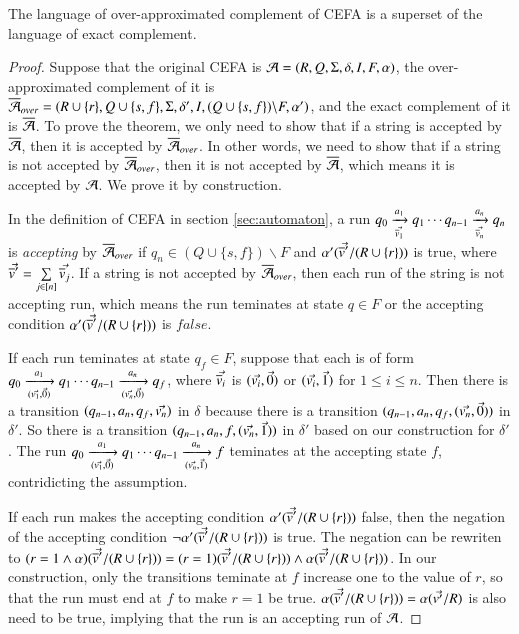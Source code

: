 \begin{theorem}
  The language of over-approximated complement of CEFA is a superset of the language of exact complement.
\end{theorem}
\begin{proof}
   Suppose that the original CEFA is $\mathcal{A} = (R, Q, \Sigma, \delta, I, F, \alpha)$, the over-approximated complement of it is $\overline{\mathcal{A}}_{over} = (R\cup\{r\}, Q\cup\{s,f\}, \Sigma, \delta', I, (Q\cup\{s,f\})\backslash F, \alpha')$, and the exact complement of it is $\overline{\mathcal{A}}$. To prove the theorem, we only need to show that if a string is accepted by $\overline{\mathcal{A}}$, then it is accepted by $\overline{\mathcal{A}}_{over}$. In other words, we need to show that if a string is not accepted by $\overline{\mathcal{A}}_{over}$, then it is not accepted by $\overline{\mathcal{A}}$, which means it is accepted by $\mathcal{A}$. We prove it by construction.
   
   In the definition of CEFA in section \ref{sec:automaton}, a run $q_0 \xrightarrow[\vec{\overline{v}_1}]{a_1} q_1 \cdots q_{n-1}\xrightarrow[\vec{\overline{v}_n}]{a_n} q_n$ is \emph{accepting} by $\overline{\mathcal{A}}_{over}$ if $q_n \in (Q\cup\{s,f\})\backslash F$ and $\alpha'(\vec{\overline{v}'}/(R\cup\{r\}))$ is true, where $\vec{\overline{v}'} = \sum \limits_{j \in [n]} \vec{\overline{v}_j}$. If a string is not accepted by $\overline{\mathcal{A}}_{over}$, then each run of the string is not accepting run, which means the run teminates at state $q\in F$ or the accepting condition $\alpha'(\vec{\overline{v}'}/(R\cup\{r\}))$ is $false$. 
   
   If each run teminates at state $q_f\in F$, suppose that each is of form $q_0\xrightarrow[(\vec{v_1},\vec{0})]{a_1}q_1\cdots q_{n-1}\xrightarrow[(\vec{v_n},\vec{0})]{a_n}q_f$, where $\vec{\overline{v}_i}$ is $(\vec{v_i}, \vec{0})$ or $(\vec{v_i}, \vec{1})$ for $1\leq i\leq n$. Then there is a transition $(q_{n-1}, a_n, q_f, \vec{v_n})$ in $\delta$ because there is a transition $(q_{n-1}, a_n, q_f, (\vec{v_n}, \vec{0}))$ in $\delta'$. So there is a transition $(q_{n-1}, a_n, f, (\vec{v_n}, \vec{1}))$ in $\delta'$ based on our construction for $\delta'$. The run $q_0\xrightarrow[(\vec{v_1},\vec{0})]{a_1}q_1\cdots q_{n-1}\xrightarrow[(\vec{v_n},\vec{1})]{a_n}f$ teminates at the accepting state $f$, contridicting the assumption. 
   
   If each run makes the accepting condition $\alpha'(\vec{\overline{v}'}/(R\cup\{r\}))$ false, then the negation of the accepting condition $\neg\alpha'(\vec{\overline{v}'}/(R\cup\{r\}))$ is true. The negation can be rewriten to $(r=1\wedge \alpha)(\vec{\overline{v}'}/(R\cup\{r\})) = (r=1)(\vec{\overline{v}'}/(R\cup\{r\}))\wedge \alpha(\vec{\overline{v}'}/(R\cup\{r\}))$. In our construction, only the transitions teminate at $f$ increase one to the value of $r$, so that the run must end at $f$ to make $r=1$ be true. $\alpha(\vec{\overline{v}'}/(R\cup\{r\})) = \alpha(\vec{v'}/R)$ is also need to be true, implying that the run is an accepting run of $\mathcal{A}$.
\end{proof}

